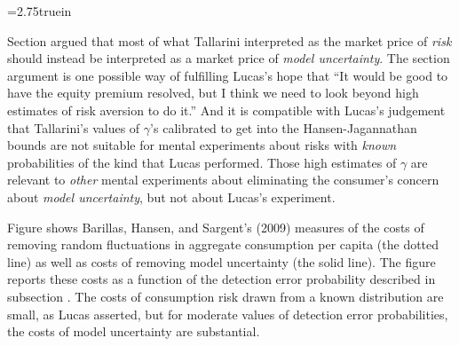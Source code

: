 \centerline{\epsfxsize=2.75truein}
\caption{Proportions $c_0- c_0^d$ of
initial consumption  that a representative consumer with model-uncertainty averse (multiplier) preferences would surrender not to confront risk (dotted line) and model uncertainty (solid line)  for random-walk model of log consumption growth, plotted as a function of detection error probability.}
\endfigure

Section   argued that most of what Tallarini interpreted as the market price of {\it risk\/} should instead be interpreted
as a market price of {\it model uncertainty}.  The section  argument    is one possible way of fulfilling Lucas's hope that ``It would be good to have the equity
premium resolved, but I think we need to look beyond high
estimates of risk aversion to do it.''  And it is compatible with Lucas's judgement that Tallarini's values of $\gamma$'s calibrated to get into the Hansen-Jagannathan bounds are
not suitable for mental experiments about risks with {\it known\/} probabilities of the kind that Lucas performed.
Those high estimates of $\gamma$ are relevant to {\it other\/} mental experiments about eliminating the consumer's concern about {\it model uncertainty\/}, but not
about Lucas's experiment. %

Figure  shows Barillas, Hansen, and Sargent's (2009) measures of the costs of removing random fluctuations in aggregate consumption per capita (the dotted line) as well as costs of removing
model uncertainty (the solid line). The figure reports these costs  as a function of the detection error probability described in subsection .  The costs of consumption risk drawn from a known distribution are small, as Lucas asserted, but for moderate
values of detection error probabilities, the costs of model uncertainty are substantial.
%




